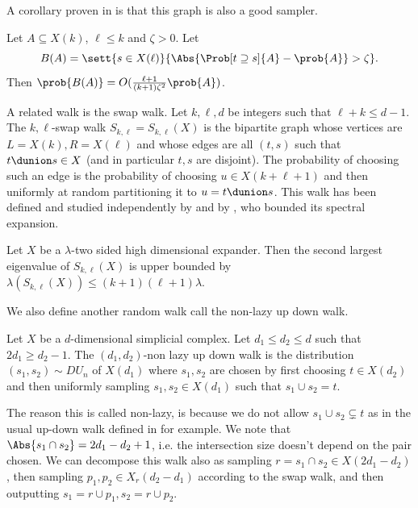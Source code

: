 A corollary proven in \cite{DinurK2017} is that this graph is also a good sampler.
\begin{corollary} \label{cor:good-sampler-from-expansion}
    Let \(A \subseteq X(k)\), \(\ell \leq k\) and \(\zeta > 0\). Let
    \[B(A) = \sett{s \in X(\ell)}{\Abs{\Prob[t\supseteq s]{A} - \prob{A}} > \zeta}.\]
    Then \(\prob{B(A)} = O(\frac{\ell+1}{(k+1) \zeta^2}\prob{A})\).
\end{corollary}

A related walk is the swap walk. Let \(k,\ell,d\) be integers such that \(\ell+k\leq d-1\). The \(k,\ell\)-swap walk \(S_{k,\ell}=S_{k,\ell}(X)\) is the bipartite graph whose vertices are \(L=X(k), R=X(\ell)\) and whose edges are all \((t,s)\) such that \(t \dunion s \in X\) (and in particular \(t,s\) are disjoint). The probability of choosing such an edge is the probability of choosing \(u \in X(k+\ell+1)\) and then uniformly at random partitioning it to \(u=t\dunion s\). This walk has been defined and studied independently by \cite{DiksteinD2019} and by \cite{AlevFT2019}, who bounded its spectral expansion.

\begin{theorem}
    Let \(X\) be a \(\lambda\)-two sided high dimensional expander. Then the second largest eigenvalue of \(S_{k,\ell}(X)\) is upper bounded by \(\lambda(S_{k,\ell}(X)) \leq (k+1)(\ell+1)\lambda\).
\end{theorem}

We also define another random walk call the non-lazy up down walk.
\begin{definition} \label{def:non-lazy-up-down}
    Let \(X\) be a \(d\)-dimensional simplicial complex. Let \(d_1\leq d_2 \leq d\) such that \(2d_1 \geq d_2-1\). The \((d_1,d_2)\)-non lazy up down walk is the distribution \((s_1,s_2) \sim DU_{n}\) of \(X(d_1)\) where \(s_1,s_2\) are chosen by first choosing \(t \in X(d_2)\) and then uniformly sampling \(s_1,s_2 \in X(d_1)\) such that \(s_1 \cup s_2 = t\).
\end{definition}
The reason this is called non-lazy, is because we do not allow \(s_1 \cup s_2 \subsetneq t\) as in the usual up-down walk defined in \cite{DiksteinDFH2018} for example. We note that \(\Abs{s_1 \cap s_2} = 2d_1-d_2+1\), i.e. the intersection size doesn't depend on the pair chosen. We can decompose this walk also as sampling \(r= s_1 \cap s_2 \in X(2d_1-d_2)\), then sampling \(p_1,p_2 \in X_r(d_2-d_1)\) according to the swap walk, and then outputting \(s_1 = r \cup p_1, s_2 = r \cup p_2\).

